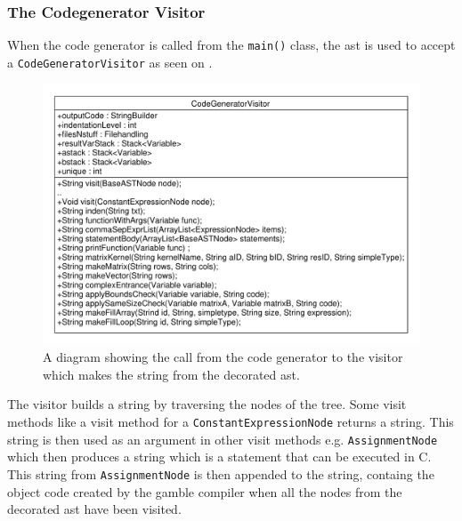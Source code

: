 \subsubsection*{The Codegenerator Visitor}
When the code generator is called from the \texttt{main()} class, the \acrshort{ast} is used to accept a \texttt{CodeGeneratorVisitor} as seen on .

\begin{figure}[!ht]
\centering
 \includegraphics[width=1\textwidth]{figures/ClassDiagrams/CodeGeneratorCall.pdf} %
\caption{A diagram showing the call from the code generator to the visitor which makes the string from the decorated \acrshort{ast}.}\label{fig:CodeGeneratorVisitor}
\vspace{-15pt}
\end{figure}

The visitor builds a string by traversing the nodes of the tree.
Some visit methods like a visit method for a \texttt{ConstantExpressionNode} returns a string.
This string is then used as an argument in other visit methods e.g. \texttt{AssignmentNode} which then produces a string which is a statement that can be executed in C.
This string from \texttt{AssignmentNode} is then appended to the string, containg the object code created by the \gls{gamble} compiler when all the nodes from the decorated \acrshort{ast} have been visited.

